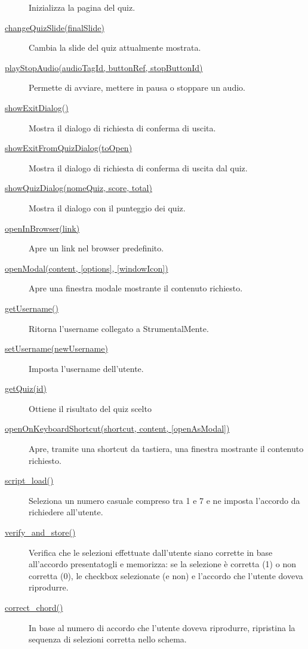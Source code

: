 \begin{description}
Inizializza la pagina del quiz.
\item[{ \protect\hyperlink{changeQuizSlide}{changeQuizSlide(finalSlide)}
}]
Cambia la slide del quiz attualmente mostrata.
\item[{ \protect\hyperlink{playStopAudio}{playStopAudio(audioTagId,
buttonRef, stopButtonId)} }]
Permette di avviare, mettere in pausa o stoppare un audio.
\item[{ \protect\hyperlink{showExitDialog}{showExitDialog()} }]
Mostra il dialogo di richiesta di conferma di uscita.
\item[{
\protect\hyperlink{showExitFromQuizDialog}{showExitFromQuizDialog(toOpen)}
}]
Mostra il dialogo di richiesta di conferma di uscita dal quiz.
\item[{ \protect\hyperlink{showQuizDialog}{showQuizDialog(nomeQuiz,
score, total)} }]
Mostra il dialogo con il punteggio dei quiz.
\item[{ \protect\hyperlink{openInBrowser}{openInBrowser(link)} }]
Apre un link nel browser predefinito.
\item[{ \protect\hyperlink{openModal}{openModal(content, {[}options{]},
{[}windowIcon{]})} }]
Apre una finestra modale mostrante il contenuto richiesto.
\item[{ \protect\hyperlink{getUsername}{getUsername()} }]
Ritorna l'username collegato a StrumentalMente.
\item[{ \protect\hyperlink{setUsername}{setUsername(newUsername)} }]
Imposta l'username dell'utente.
\item[{ \protect\hyperlink{getQuiz}{getQuiz(id)} }]
Ottiene il risultato del quiz scelto
\item[{
\protect\hyperlink{openOnKeyboardShortcut}{openOnKeyboardShortcut(shortcut,
content, {[}openAsModal{]})} }]
Apre, tramite una shortcut da tastiera, una finestra mostrante il
contenuto richiesto.
\item[{ \protect\hyperlink{script_load}{script\_load()} }]
Seleziona un numero casuale compreso tra 1 e 7 e ne imposta l'accordo da
richiedere all'utente.
\item[{ \protect\hyperlink{verify_and_store}{verify\_and\_store()} }]
Verifica che le selezioni effettuate dall'utente siano corrette in base
all'accordo presentatogli e memorizza: se la selezione è corretta (1) o
non corretta (0), le checkbox selezionate (e non) e l'accordo che
l'utente doveva riprodurre.
\item[{ \protect\hyperlink{correct_chord}{correct\_chord()} }]
In base al numero di accordo che l'utente doveva riprodurre, ripristina
la sequenza di selezioni corretta nello schema.
\end{description}

